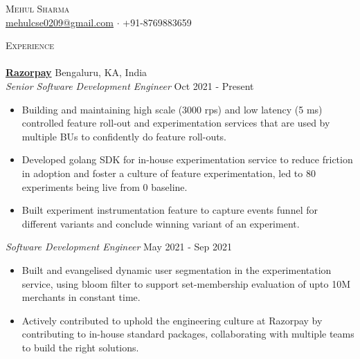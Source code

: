 \documentclass[a4paper]{article}
\newcommand{\lineunder} {
    \vspace*{-8pt} \\
    \hspace*{-18pt} \hrulefill \\
}
\newcommand{\header} [1] {
    {\hspace*{-18pt}\vspace*{6pt} \textsc{#1}}
    \vspace*{-6pt} \lineunder
}
\begin{document}
\vspace*{-40pt}

    

\vspace*{-10pt}
\begin{center}
	{\Huge \scshape {Mehul Sharma}}\\
	\href{mailto:mehulcse0209@gmail.com}{mehulcse0209@gmail.com} $\cdot$  +91-8769883659 
	
\end{center}


\header{Experience}
\vspace{1mm}
\textbf{\href{http://razorpay.com/}{Razorpay}} \hfill Bengaluru, KA, India\\
\textit{Senior Software Development Engineer} \hfill Oct 2021 - Present\\
\vspace{-1mm}
\begin{itemize} \itemsep 0.5pt
	\item Building and maintaining high scale (3000 rps) and low latency (5 ms) controlled feature roll-out and experimentation services that are used by multiple BUs to confidently do feature roll-outs.
	\item Developed golang SDK for in-house experimentation service to reduce friction in adoption and foster a culture of feature experimentation, led to 80 experiments being live from 0 baseline.
	\item Built experiment instrumentation feature to capture events funnel for different variants and conclude winning variant of an experiment. 
\end{itemize}
\textit{Software Development Engineer} \hfill May 2021 - Sep 2021\\
\vspace{-1mm}
\begin{itemize} \itemsep 0.5pt
	\item Built and evangelised dynamic user segmentation in the experimentation service, using bloom filter to support set-membership evaluation of upto 10M merchants in constant time.
	\item Actively contributed to uphold the engineering culture at Razorpay by contributing to in-house standard packages, collaborating with multiple teams to build the right solutions.
\end{itemize}
\end{document}
